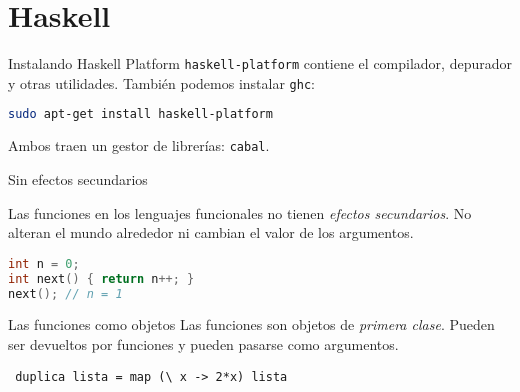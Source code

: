 \section{Haskell}

\begin{frame}[fragile]{Instalando Haskell Platform}
  \texttt{haskell-platform} contiene el compilador, depurador y otras utilidades.
  También podemos instalar \texttt{ghc}:
  \espacio
  \begin{lstlisting}[language=bash]
sudo apt-get install haskell-platform
  \end{lstlisting}
  \espacio
  Ambos traen un gestor de librerías: \texttt{cabal}.
\end{frame}

\begin{frame}[fragile]{Sin efectos secundarios}

    Las funciones en los lenguajes funcionales no tienen \textit{efectos secundarios}.
    No alteran el mundo alrededor ni cambian el valor de los argumentos.
    \espacio
  \begin{lstlisting}[language=C++]
int n = 0;
int next() { return n++; }
next(); // n = 1
  \end{lstlisting}

\end{frame}

\begin{frame}[fragile]{Las funciones como objetos}
 Las funciones son objetos de \textit{primera clase}. Pueden ser devueltos
 por funciones y pueden pasarse como argumentos.

 \begin{lstlisting}
 duplica lista = map (\ x -> 2*x) lista
 \end{lstlisting}

\end{frame}

